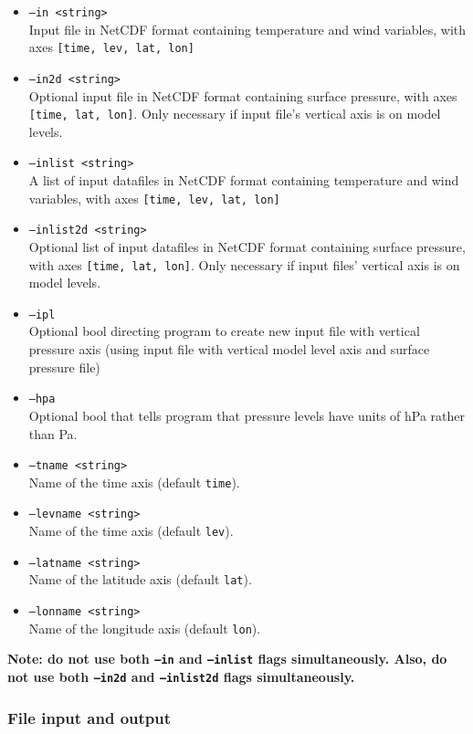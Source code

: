 \documentclass{article}
\begin{document}
\begin{itemize}
\item[]\texttt{--in <string>} \\ Input file in NetCDF format containing temperature and wind variables, with axes \texttt{[time, lev, lat, lon]}
\item[]\texttt{--in2d <string>} \\ Optional input file in NetCDF format containing surface pressure, with axes \texttt{[time, lat, lon]}. Only necessary if input file's vertical axis is on model levels.
\item[]\texttt{--inlist <string>} \\ A list of input datafiles in NetCDF format containing temperature and wind variables, with axes \texttt{[time, lev, lat, lon]}
\item[]\texttt{--inlist2d <string>} \\ Optional list of input datafiles in NetCDF format containing surface pressure, with axes \texttt{[time, lat, lon]}. Only necessary if input files' vertical axis is on model levels.
\item[]\texttt{--ipl}\\ Optional bool directing program to create new input file with vertical pressure axis (using input file with vertical model level axis and surface pressure file)
\item[]\texttt{--hpa} \\ Optional bool that tells program that pressure levels have units of hPa rather than Pa.
\item[] \texttt{--tname <string>}\\Name of the time axis (default \texttt{time}).
\item[] \texttt{--levname <string>}\\Name of the time axis (default \texttt{lev}).
\item[]\texttt{--latname <string>}\\Name of the latitude axis (default \texttt{lat}).
\item[]\texttt{--lonname <string>}\\Name of the longitude axis (default \texttt{lon}).
\end{itemize}

\textbf{Note: do not use both \texttt{--in} and \texttt{--inlist} flags simultaneously. Also, do not use both \texttt{--in2d} and \texttt{--inlist2d} flags simultaneously.}



\subsubsection{File input and output}
\end{document}
